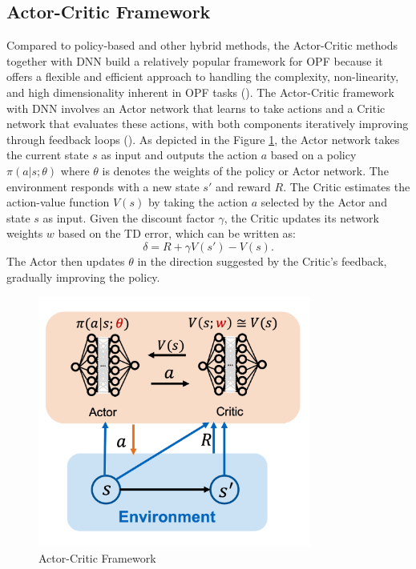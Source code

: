 \subsection{Actor-Critic Framework}\label{subsec:A-C}
Compared to policy-based and other hybrid methods, the Actor-Critic methods together with \gls{DNN} build a relatively popular framework for \gls{OPF} because it offers a flexible and efficient approach to handling the complexity, non-linearity, and high dimensionality inherent in \gls{OPF} tasks (\cite{arwa2020reinforcement, chen2022reinforcement, massaoudi2023navigating}). The Actor-Critic framework with \gls{DNN} involves an Actor network that learns to take actions and a Critic network that evaluates these actions, with both components iteratively improving through feedback loops (\cite{konda1999actor}). As depicted in the Figure \ref{fig:A-C}, the Actor network takes the current state $s$ as input and outputs the action $a$ based on a policy $\pi(a|s;\theta)$ where $\theta$ is denotes the weights of the policy or Actor network. The environment responds with a new state $s'$ and reward $R$. The Critic estimates the action-value function $V(s)$ by taking the action $a$ selected by the Actor and state $s$ as input. Given the discount factor $\gamma$, the Critic updates its network weights $w$ based on the \gls{TD} error, which can be written as:
\begin{equation*}
    \delta = R + \gamma V(s') - V(s).
\end{equation*}
The Actor then updates $\theta$ in the direction suggested by the Critic's feedback, gradually improving the policy.
\begin{figure}[h!]
\begin{center}
\includegraphics[width=0.8\textwidth]{LaTeX_Vorlagen_Studienarbeiten/images/A-C Framework.png}
\caption{Actor-Critic Framework}
\label{fig:A-C}
\end{center}
\end{figure}


